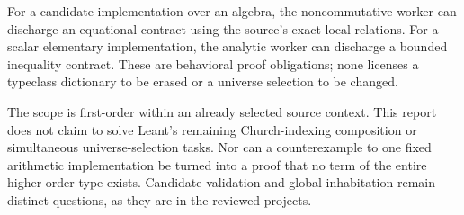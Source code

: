 For a candidate implementation over an algebra, the noncommutative worker can discharge an equational contract using the source's exact local relations. For a scalar elementary implementation, the analytic worker can discharge a bounded inequality contract. These are behavioral proof obligations; none licenses a typeclass dictionary to be erased or a universe selection to be changed.

The scope is first-order within an already selected source context. This report does not claim to solve Leant's remaining Church-indexing composition or simultaneous universe-selection tasks. Nor can a counterexample to one fixed arithmetic implementation be turned into a proof that no term of the entire higher-order type exists. Candidate validation and global inhabitation remain distinct questions, as they are in the reviewed projects.
